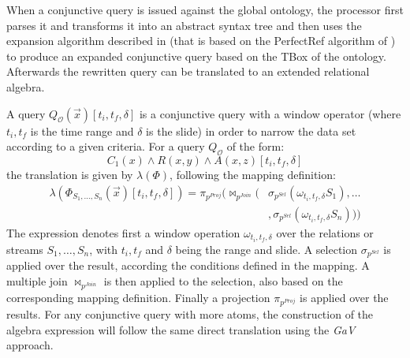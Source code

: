 When a conjunctive query is issued against the global ontology, the processor first parses it and transforms it into an
abstract syntax tree and then uses the expansion algorithm described in \cite{Barrasa_04} (that is based on the
\textsf{PerfectRef} algorithm of \cite{Calvanese_05}) to produce an expanded conjunctive query based on the TBox of the
ontology. Afterwards the rewritten query can be translated to an extended relational algebra.

A query $Q_{\mathcal{O}}(\vec{x})[t_i,t_f,\delta]$ is a conjunctive query with a window operator (where $t_i,t_f$ is
the time range and $\delta$ is the slide) in order to narrow the data set according to a given criteria. For a query
$Q_{\mathcal{O}}$ of the form:
\begin{equation*}
C_1(x) \wedge R(x,y) \wedge A(x,z) [t_i,t_f,\delta]
\end{equation*}
the translation is given by $\lambda(\Phi)$, following the mapping definition:
\begin{align*}
\lambda(\Phi_{S_1,\ldots,S_n}(\vec{x})[t_i,t_f,\delta])=\pi_{p^{Proj}}(\Join_{p^{Join}}
(&\sigma_{p^{Sel}}(\omega_{t_i,t_f,\delta}S_1),\dots \\ &,\sigma_{p^{Sel}}(\omega_{t_i,t_f,\delta}S_n)))
\end{align*}
The expression denotes first a window operation $\omega_{t_i,t_f,\delta}$ over the relations or streams $S_1,\dots
,S_n$, with $t_i,t_f$ and $\delta$ being the range and slide. A selection $\sigma_{p^{Sel}}$ is applied over the
result, according the conditions defined in the mapping.  A multiple join $\Join_{p^{Join}}$ is then applied to the
selection, also based on the corresponding mapping definition. Finally a projection $\pi_{p^{Proj}}$ is applied over
the results. For any conjunctive query with more atoms, the construction of the algebra expression will follow the same
direct translation using the \textit{GaV} approach.
%
